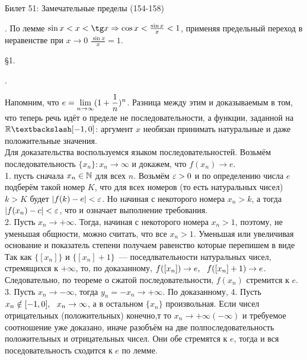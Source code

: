 Билет 51: Замечательные пределы
(154-158)

.
По лемме $\sin x < x < \tg x \Ra \cos x < \frac {\sin x}x < 1$, применяя предельный переход в неравенстве при $x \to 0$ $\frac{\sin x}x = 1$.

\S1. 

. 

\D Напомним, что $e = \displaystyle \lim\limits^{}_{n\to\infty} (1 + \frac 1n)^n$. Разница между этим и доказываемым в том, что теперь речь идёт о пределе не последовательности, а функции, заданной на $\R \bsl [-1, 0]$: аргумент $x$ необязан принимать натуральные и даже положительные значения.\\
Для доказательства воспользуемся языком последовательностей. Возьмём последовательность $\{x_n\}: x_n \to \infty$ и докажем, что $f(x_n) \to e$.\\
1. пусть сначала $x_n \in \mathbb{N}$ для всех $n$. Возьмём $\varepsilon > 0$ и по определению числа $e$ подберём такой номер $K$, что для всех номеров (то есть натуральных чисел) $k > K$ будет $|f(k) - e| < \varepsilon$. Но начиная с некоторого номера $x_n > k$, а тогда $|f(x_n) - c| < \varepsilon$, что и означает выполнение требования.\\
2. Пусть $x_n \to +\infty$. Тогда, начиная с некоторого номера $x_n > 1$, поэтому, не уменьшая общности, можно считать, что все $x_n > 1$. Уменьшая или увеличивая основание и показатель степени получаем равенство  которые перепишем в виде
 Так как $\{[x_n]\}$ и $\{[x_n] + 1\}$~--- поседлвательности натуральных чисел, стремящихся к $+\infty$, то, по доказанному, $f([x_n]) \to e,\ \  f([x_n] + 1) \to e$. Следовательно, по теореме о сжатой последовательности, $f(x_n)$ стремится к $e$.\\
3. Пусть $x_n \to -\infty$, тогда $y_n = -x_n \to +\infty$. По доказанному, 
4. Пусть $x_n \notin [-1, 0],\ \  x_n \to \infty$, а в остальном $\{
x_n\}$ произвольная. Если чисел отрицательных (положительных) конечно,т то $x_n \to +\infty (-\infty)$ и требуемое соотношение уже доказано, иначе разобъём на две полпоследовательность положительных и отрицательных чисел. Они обе стремятся к $e$, тогда и вся поседовательность сходится к $e$ по лемме.

